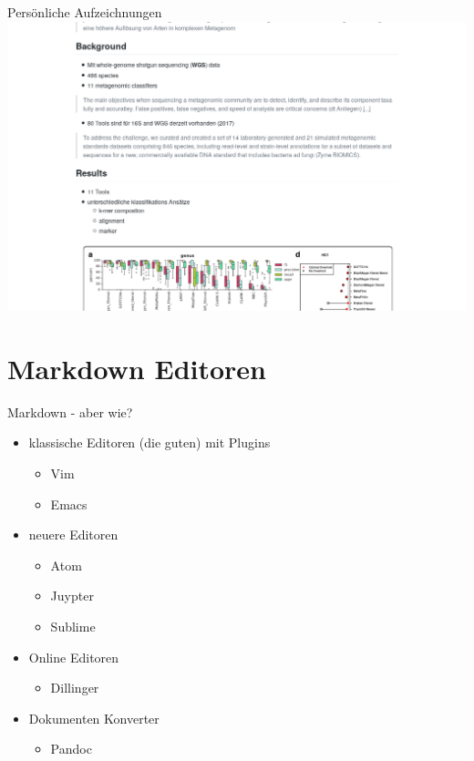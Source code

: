 \documentclass{beamer}
\begin{document}

\begin{frame}{Persönliche Aufzeichnungen}
        \includegraphics[scale=0.25]{aufzeichnungen.png}
\end{frame}


\section{Markdown Editoren}

\begin{frame}{Markdown - aber wie?}
\begin{itemize}
    \item klassische Editoren (die guten) mit Plugins
    \begin{itemize}
        \item Vim
        \item Emacs
    \end{itemize}
    \item neuere Editoren    
    \begin{itemize}
        \item Atom
        \item Juypter
        \item Sublime
    \end{itemize}
    \item Online Editoren
    \begin{itemize}
        \item Dillinger
    \end{itemize}
    \item Dokumenten Konverter
        \begin{itemize}
            \item Pandoc
        \end{itemize}
    \end{itemize}
\end{frame}
\end{document}
